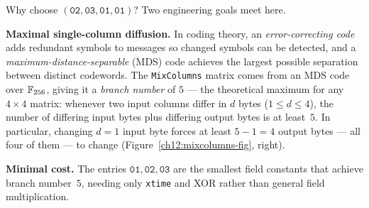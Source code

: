 \begin{whybox}
Why choose $(\mathtt{02},\mathtt{03},\mathtt{01},\mathtt{01})$? Two engineering
goals meet here.

\textbf{Maximal single-column diffusion.} In coding theory, an
\emph{error-correcting code} adds redundant symbols to messages so changed symbols
can be detected, and a \emph{maximum-distance-separable} (MDS) code achieves the
largest possible separation between distinct codewords. The \texttt{MixColumns}
matrix comes from an MDS code over $\mathbb{F}_{256}$, giving it a \emph{branch number}
of $5$ --- the theoretical maximum for any $4\times 4$ matrix: whenever two input
columns differ in $d$ bytes ($1 \le d \le 4$), the number of differing input bytes
plus differing output bytes is at least~$5$. In particular, changing $d = 1$ input
byte forces at least $5 - 1 = 4$ output bytes --- all four of them --- to change
(Figure~\ref{ch12:mixcolumns-fig}, right).

\textbf{Minimal cost.} The entries $\mathtt{01},\mathtt{02},\mathtt{03}$ are the
smallest field constants that achieve branch number~$5$, needing only
\texttt{xtime} and XOR rather than general field multiplication.
\end{whybox}

